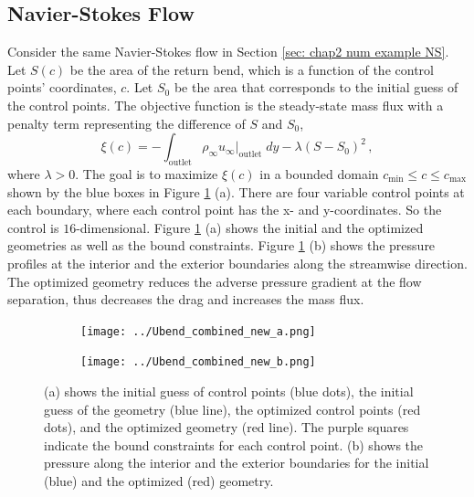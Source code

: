 \subsection{Navier-Stokes Flow}
Consider the same Navier-Stokes flow in Section 
\ref{sec: chap2 num example NS}.
Let $S(c)$ be the area of the return bend, which is a function of the 
control points' coordinates, $c$. Let $S_0$ be the area that corresponds to
the initial guess of the control points. 
The objective function is the steady-state mass flux with a penalty term representing the difference 
of $S$ and $S_0$,
\begin{equation}
    \xi(c) = - \int_{\textrm{outlet}} \rho_\infty u_\infty \big|_{\textrm{outlet}} \; dy
    - \lambda (S-S_0)^2\,,
    \label{eqn: mass flux 2}
\end{equation}
where $\lambda>0$. The goal is to maximize $\xi(c)$ in a bounded domain
$c_{\min}\le c\le c_{\max}$ shown by the blue boxes in Figure 
\ref{fig: NS opt geo combined} (a). 
There are four variable control points at each boundary, where each control point
has the x- and y-coordinates. So the
control is $16$-dimensional.
Figure \ref{fig: NS opt geo combined} (a) shows
the initial and the optimized geometries as well as the bound constraints.
Figure \ref{fig: NS opt geo combined} (b)
shows the pressure profiles at the interior and the exterior boundaries along
the streamwise direction. The optimized geometry reduces the adverse pressure
gradient at the flow separation, thus decreases the drag and increases the
mass flux.\\

\begin{figure}[htbp]\begin{center}
    \begin{subfigure}[t]{.35\textwidth}
        \centering
        \texttt{[image: ../Ubend\_combined\_new\_a.png]}
        \caption{}
    \end{subfigure}
    \begin{subfigure}[t]{.64\textwidth}
        \centering
        \texttt{[image: ../Ubend\_combined\_new\_b.png]}
        \caption{}
    \end{subfigure}
    \caption{(a) shows the initial guess of control points (blue dots), 
             the initial guess of the geometry (blue line),
             the optimized control points (red dots), and the optimized
             geometry (red line). The purple squares indicate the bound 
             constraints for each control point. (b) shows the 
             pressure along the interior and the exterior boundaries for
             the initial (blue) and the optimized (red) geometry.}
    \label{fig: NS opt geo combined}
\end{center}\end{figure}

